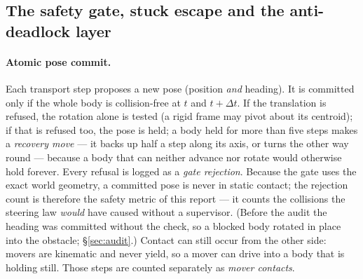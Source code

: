 \subsection{The safety gate, stuck escape and the anti-deadlock layer}
\label{sec:gate}

\paragraph{Atomic pose commit.} Each transport step proposes a new pose
(position \emph{and} heading). It is committed only if the whole body is
collision-free at $t$ and $t+\Delta t$. If the translation is refused, the
rotation alone is tested (a rigid frame may pivot about its centroid); if
that is refused too, the pose is held; a body held for more than five
steps makes a \emph{recovery move} --- it backs up half a step along its
axis, or turns the other way round --- because a body that can neither
advance nor rotate would otherwise hold forever. Every refusal is logged
as a \emph{gate rejection}. Because the gate uses the exact world geometry, a
committed pose is never in static contact; the rejection count is therefore
the safety metric of this report --- it counts the collisions the steering
law \emph{would} have caused without a supervisor. (Before the audit the
heading was committed without the check, so a blocked body rotated in place
into the obstacle; \S\ref{sec:audit}.) Contact can still occur from the
other side: movers are kinematic and never yield, so a mover can drive into
a body that is holding still. Those steps are counted separately as
\emph{mover contacts}.

